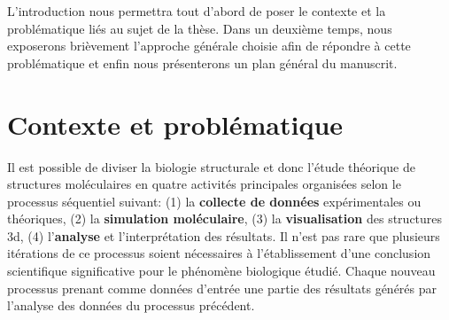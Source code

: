 

L'introduction nous permettra tout d'abord de poser le contexte et la problématique liés au sujet de la thèse. Dans un deuxième temps, nous exposerons brièvement l'approche générale choisie afin de répondre à cette problématique et enfin nous présenterons un plan général du manuscrit.

\section*{Contexte et problématique}

Il est possible de diviser la biologie structurale et donc l'étude théorique de structures moléculaires en quatre activités principales organisées selon le processus séquentiel suivant: (1) la \textbf{collecte de données} expérimentales ou théoriques, (2) la \textbf{simulation moléculaire}, (3) la \textbf{visualisation} des structures 3d, (4) l’\textbf{analyse} et l’interprétation des résultats. Il n'est pas rare que plusieurs itérations de ce processus soient nécessaires à l'établissement d'une conclusion scientifique significative pour le phénomène biologique étudié. Chaque nouveau processus prenant comme données d'entrée une partie des résultats générés par l'analyse des données du processus précédent.  

